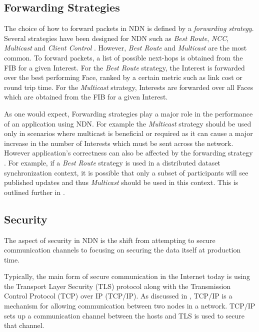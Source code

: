 \subsection{Forwarding Strategies}\label{sec:sota:forwarding-strats}
The choice of how to forward packets in NDN is defined by a \textit{forwarding strategy}. Several strategies have been designed for NDN such as \textit{Best Route}, \textit{NCC}, \textit{Multicast} and \textit{Client Control} \cite{ndn-sim-forwarding-strategies}. However, \textit{Best Route} and \textit{Multicast} are the most common. To forward packets, a list of possible next-hops is obtained from the FIB for a given Interest. For the \textit{Best Route} strategy, the Interest is forwarded over the best performing Face, ranked by a certain metric such as link cost or round trip time. For the \textit{Multicast} strategy, Interests are forwarded over all Faces which are obtained from the FIB for a given Interest.

As one would expect, Forwarding strategies play a major role in the performance of an application using NDN. For example the \textit{Multicast} strategy should be used only in scenarios where multicast is beneficial or required as it can cause a major increase in the number of Interests which must be sent across the network. However application’s correctness can also be affected by the forwarding strategy \cite{forwarding-strategies}. For example, if a \textit{Best Route} strategy is used in a distributed dataset synchronization context, it is possible that only a subset of participants will see published updates and thus \textit{Multicast} should be used in this context. This is outlined further in .



\subsection{Security}
The aspect of security in NDN is the shift from attempting to secure communication channels to focusing on securing the data itself at production time. 

Typically, the main form of secure communication in the Internet today is using the Transport Layer Security (TLS) protocol \cite{TLS}  along with the Transmission Control Protocol (TCP) over IP (TCP/IP). As discussed in , TCP/IP is a mechanism for allowing communication between two nodes in a network. TCP/IP sets up a communication channel between the hosts and TLS is used to secure that channel. 

